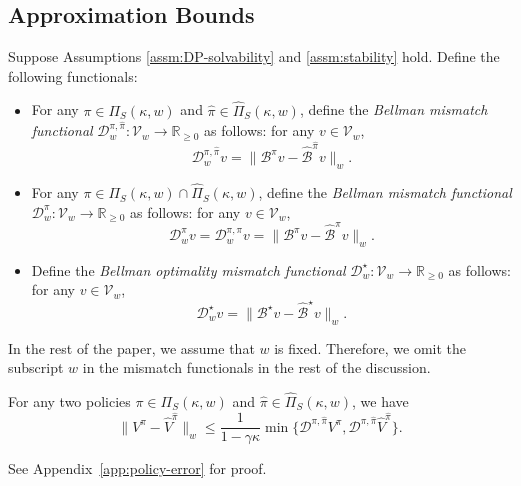 \documentclass[letterpaper, 10pt]{IEEEtran}
\newcommand*\ALPHABET{\mathcal}
\newcommand*\reals{\mathds{R}}
\newcommand*\BELLMAN{\mathscr{B}}
\newcommand*\MISMATCH{\mathscr{D}}
\newcommand*\tuple{\kappa, w}
\begin{document}
\subsection{Approximation Bounds}

\begin{definition} 
\label{def:bellman_mismatch}
Suppose Assumptions \ref{assm:DP-solvability} and \ref{assm:stability} hold. Define the following functionals:
\begin{itemize}
    \item  For any $\pi \in \Pi_S(\tuple)$ and $\hat\pi \in \hat \Pi_S(\tuple)$, define the \emph{Bellman mismatch functional}  $\MISMATCH_w^{\pi,\hat\pi} \colon \ALPHABET V_w \to \reals_{\ge 0}$  as follows: for any $v \in \ALPHABET V_w$,
    \[
        \MISMATCH^{\pi,\hat\pi}_w v = \| \BELLMAN^{\pi} v - \hat{\BELLMAN}^{\hat \pi} v \|_w.
    \]

    \item For any $\pi \in \Pi_S(\tuple) \cap \hat \Pi_S(\tuple)$, define the \emph{Bellman mismatch functional} $\MISMATCH^\pi_w \colon \ALPHABET V_w \to \reals_{\ge 0}$ as follows: for any $v \in \ALPHABET V_w$, 
    \[
        \MISMATCH_w^{\pi}v = 
        \MISMATCH_w^{\pi,\pi}v
        =
        \| \BELLMAN^{\pi}v - \hat{\BELLMAN}^{\pi}v \|_w.
    \]

    \item Define the \emph{Bellman optimality mismatch functional} $\MISMATCH^\star_w \colon \ALPHABET V_w \to \reals_{\ge 0}$  as follows: for any $v \in \ALPHABET V_w$, 
    \[
        \MISMATCH_w^{\star}v = \| \BELLMAN^{\star} v - \hat{\BELLMAN}^{\star} v \|_w.
    \]
\end{itemize}
\end{definition}
In the rest of the paper, we assume that $w$ is fixed. Therefore, we omit the subscript $w$ in the mismatch functionals  in the rest of the discussion.

\begin{lemma}\label{lem:policy-error}
For any two policies $\pi \in \Pi_S(\tuple)$ and $\hat\pi \in \hat \Pi_S(\tuple)$,  we have
    \begin{equation}\label{eq:DeltaVpi}
        \| V^\pi - \hat V^{\hat\pi} \|_w \le \frac{1}{1-\gamma \kappa} 
        \min \bigl\{ \MISMATCH^{\pi,\hat\pi} V^\pi, \MISMATCH^{\pi,\hat\pi} \hat V^{\hat\pi} \bigr\}.
    \end{equation}
\end{lemma}
See Appendix~\ref{app:policy-error} for proof.
\end{document}
